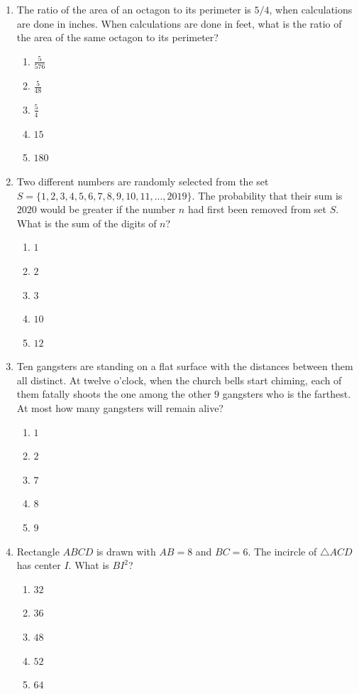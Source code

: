 \documentclass{article}
\begin{document}
\begin{enumerate}
\item The ratio of the area of an octagon to its perimeter is $5/4$, when calculations are done in inches. When calculations are done in feet, what is the ratio of the area of the same octagon to its perimeter?
\begin{enumerate}
    \item $\frac{5}{576}$
    \item $\frac{5}{48}$
    \item $\frac{5}{4}$
    \item $15$
    \item $180$
\end{enumerate}

\item Two different numbers are randomly selected from the set $S=\{1,2,3,4,5,6,7,8,9,10,11,...,2019\}$. The probability that their sum is $2020$ would be greater if the number $n$ had first been removed from set $S$. What is the sum of the digits of $n$?
\begin{enumerate}
    \item $1$
    \item $2$
    \item $3$
    \item $10$
    \item $12$
\end{enumerate}

\item Ten gangsters are standing on a flat surface with the distances between them all distinct. At twelve o'clock, when the church bells start chiming, each of them fatally shoots the one among the other $9$ gangsters who is the farthest. At most how many gangsters will remain alive?
\begin{enumerate}
    \item $1$
    \item $2$
    \item $7$
    \item $8$
    \item $9$
\end{enumerate}

\item Rectangle $ABCD$ is drawn with $AB=8$ and $BC=6$. The incircle of $\triangle ACD$ has center $I$. What is $BI^{2}$?
\begin{enumerate}
    \item $32$
    \item $36$
    \item $48$
    \item $52$
    \item $64$
\end{enumerate}


\end{enumerate}
\end{document}
